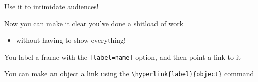 \documentclass[notes,11pt, aspectratio=169]{beamer}
\newenvironment{wideitemize}{\itemize\addtolength{\itemsep}{10pt}}{\enditemize}
\begin{document}
\begin{frame}[label=appendix_end]{Use it to intimidate audiences!}
  \begin{wideitemize}
    \item[] Now you can make it clear you've done a shitload of work
      \begin{itemize}
      \item[]  without having to show everything! \hyperlink{appendix_start}{}
      \end{itemize}
    \item[] You label a frame with the \texttt{[label=name]} option, and then point a link to it
    \item[] You can make an object a link using the \texttt{\textbackslash hyperlink\{label\}\{object\}} command
  \end{wideitemize}
\end{frame}
\end{document}
